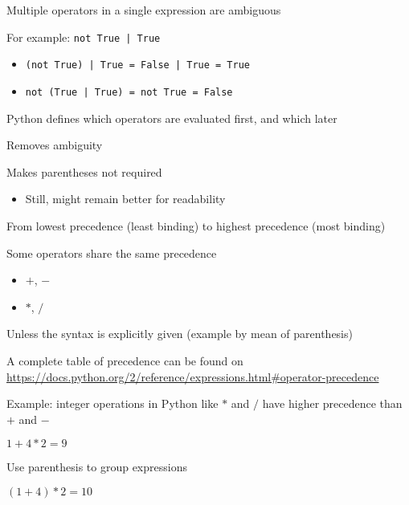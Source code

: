 \documentclass{beamer}
\begin{document}
\begin{slide}{
\item Multiple operators in a single expression are ambiguous
\item For example: \texttt{not True | True}
\begin{itemize}
\item \texttt{(not True) | True = False | True = True}
\item \texttt{not (True | True) = not True = False}
\end{itemize}
}\end{slide}

\begin{slide}{
\item Python defines which operators are evaluated first, and which later
\item Removes ambiguity
\item Makes parentheses not required
\begin{itemize}
\item Still, might remain better for readability
\end{itemize}
}\end{slide}

\begin{slide}{
\item From lowest precedence (least binding) to highest precedence (most binding) 
\pause
\item Some operators share the same precedence 
\begin{itemize}
\item $+$, $-$
\item $*$, $/$
\end{itemize}
\pause
\item Unless the syntax is explicitly given (example by mean of parenthesis)
\pause
\item A complete table of precedence can be found on \url{https://docs.python.org/2/reference/expressions.html\#operator-precedence}
}\end{slide}

\begin{slide}{
\item Example: integer operations in Python like $*$ and $/$ have higher precedence than $+$ and $-$
\item $1 + 4 * 2 = 9$
\pause
\item Use parenthesis to group expressions 
\item $(1 + 4) * 2 = 10$  
}\end{slide}
\end{document}
